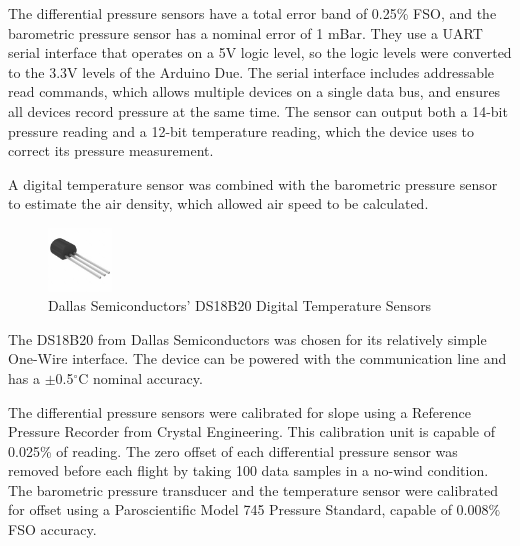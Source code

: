 The differential pressure sensors have a total error band of 0.25\% FSO, and the barometric pressure sensor has a nominal error of 1 mBar. They use a UART serial interface that operates on a 5V logic level, so the logic levels were converted to the 3.3V levels of the Arduino Due. The serial interface includes addressable read commands, which allows multiple devices on a single data bus, and ensures all devices record pressure at the same time. The sensor can output both a 14-bit pressure reading and a 12-bit temperature reading, which the device uses to correct its pressure measurement.

A digital temperature sensor was combined with the barometric pressure sensor to estimate the air density, which allowed air speed to be calculated.

\begin{figure}[H]
  \centering
    \includegraphics[width=0.15\textwidth]{figures/ds18b20Picture.jpg}
  \caption{Dallas Semiconductors' DS18B20 Digital Temperature Sensors} \label{ds18b20Picture}
\end{figure}

 The DS18B20 from Dallas Semiconductors was chosen for its relatively simple One-Wire interface. The device can be powered with the communication line and has a $\pm$0.5$^\circ$C nominal accuracy\cite{DS18B20Datasheet}.

The differential pressure sensors were calibrated for slope using a Reference Pressure Recorder from Crystal Engineering\cite{pressCalib}. This calibration unit is capable of 0.025\% of reading. The zero offset of each differential pressure sensor was removed before each flight by taking 100 data samples in a no-wind condition. The barometric pressure transducer and the temperature sensor were calibrated for offset using a Paroscientific Model 745 Pressure Standard, capable of $0.008\%$ FSO accuracy\cite{pressureStandard}. 

